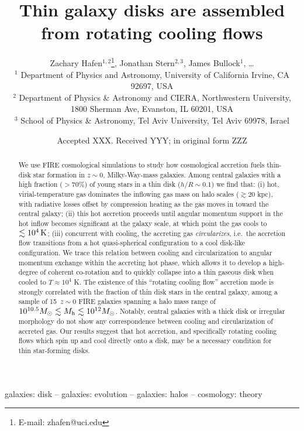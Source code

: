 \documentclass[fleqn,usenatbib]{mnras}
\title[Rotating cooling flows and thin galactic disks]{Thin galaxy disks are assembled from rotating cooling flows}
\author[Hafen, Stern, Bullock et al.]{
Zachary Hafen$^{1,2}$\thanks{E-mail: zhafen@uci.edu},
Jonathan Stern$^{2,3}$,
James Bullock$^{1}$,
\ldots
\\
$^1$ Department of Physics and Astronomy, University of California Irvine, CA 92697, USA
\\
$^2$ Department of Physics \& Astronomy and CIERA, Northwestern University, 1800 Sherman Ave, Evanston, IL 60201, USA \\
$^3$ School of Physics \& Astronomy, Tel Aviv University, Tel Aviv 69978, Israel
}
\date{Accepted XXX. Received YYY; in original form ZZZ}
\newcommand{\Nsample}{15}
\begin{document}
\label{firstpage}
\pagerange{\pageref{firstpage}--\pageref{lastpage}}
\maketitle

\begin{abstract}
We use FIRE cosmological simulations to study how cosmological accretion fuels thin-disk star formation in $z\sim 0$, Milky-Way-mass galaxies.
Among central galaxies with a high fraction ($>70\%$) of young stars in a thin disk ($h/R \sim 0.1$) we find that:
(i) hot, virial-temperature gas dominates the inflowing gas mass on halo scales ($\gtrsim 20$ kpc), with radiative losses offset by compression heating as the gas moves in toward the central galaxy;
(ii) this hot accretion proceeds until angular momentum support in the hot inflow becomes significant at the galaxy scale, at which point the gas cools to $\lesssim10^4\,{\rm K}$; 
(iii) concurrent with cooling, the accreting gas \textit{circularizes}, i.e.\ the accretion flow transitions from a hot quasi-spherical configuration to a cool disk-like configuration. We trace this relation between cooling and circularization to angular momentum exchange within the accreting hot phase, which allows it to develop a high-degree of coherent co-rotation and to quickly collapse into a thin gaseous disk when cooled to $T \approx 10^4$ K.
The existence of this ``rotating cooling flow'' accretion mode is strongly correlated with the fraction of thin disk stars in the central galaxy, among a sample of \Nsample\ $z\sim0$ FIRE galaxies spanning a halo mass range of $10^{10.5} M_\odot \lesssim M_{\rm h} \lesssim 10^{12} M_\odot$.
Notably, central galaxies with a thick disk or irregular morphology do not show any correspondence between cooling and circularization of accreted gas. 
Our results suggest that hot accretion, and specifically rotating cooling flows which spin up and cool directly onto a disk, may be a necessary condition for thin star-forming disks.
\end{abstract}

\begin{keywords}
galaxies: disk -- galaxies: evolution -- galaxies: halos -- cosmology: theory
\end{keywords}

\end{document}
